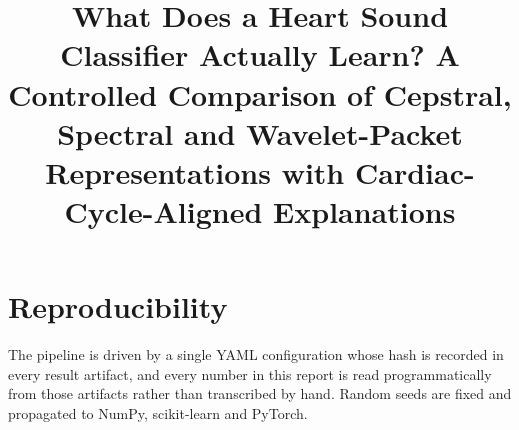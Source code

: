 \documentclass[conference]{IEEEtran}
\begin{document}
\title{What Does a Heart Sound Classifier Actually Learn?
A Controlled Comparison of Cepstral, Spectral and Wavelet-Packet
Representations with Cardiac-Cycle-Aligned Explanations}

\author{
}

\maketitle













\section*{Reproducibility}
The pipeline is driven by a single YAML configuration whose hash is recorded in
every result artifact, and every number in this report is read programmatically
from those artifacts rather than transcribed by hand. Random seeds are fixed
and propagated to NumPy, scikit-learn and PyTorch.



\end{document}
